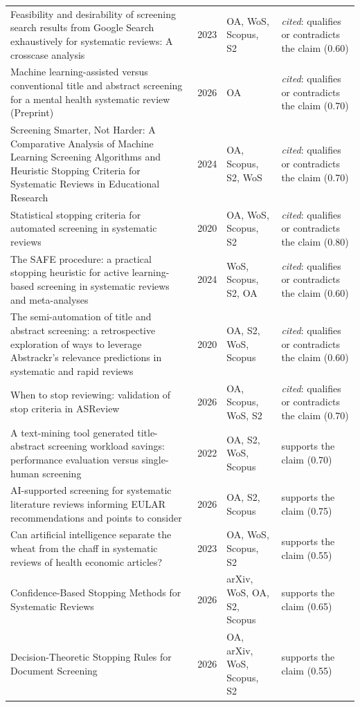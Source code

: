 \begin{longtable}{@{}%
  >{\raggedright\arraybackslash}p{}c%
  >{\raggedright\arraybackslash}p{}%
  >{\raggedright\arraybackslash}p{}@{}}
Feasibility and desirability of screening search results from Google Search exhaustively for systematic reviews: A crosscase analysis & 2023 & OA, WoS, Scopus, S2 & \emph{cited}: qualifies or contradicts the claim (0.60) \\
Machine learning-assisted versus conventional title and abstract screening for a mental health systematic review (Preprint) & 2026 & OA & \emph{cited}: qualifies or contradicts the claim (0.70) \\
Screening Smarter, Not Harder: A Comparative Analysis of Machine Learning Screening Algorithms and Heuristic Stopping Criteria for Systematic Reviews in Educational Research & 2024 & OA, Scopus, S2, WoS & \emph{cited}: qualifies or contradicts the claim (0.70) \\
Statistical stopping criteria for automated screening in systematic reviews & 2020 & OA, WoS, Scopus, S2 & \emph{cited}: qualifies or contradicts the claim (0.80) \\
The SAFE procedure: a practical stopping heuristic for active learning-based screening in systematic reviews and meta-analyses & 2024 & WoS, Scopus, S2, OA & \emph{cited}: qualifies or contradicts the claim (0.60) \\
The semi-automation of title and abstract screening: a retrospective exploration of ways to leverage Abstrackr's relevance predictions in systematic and rapid reviews & 2020 & OA, S2, WoS, Scopus & \emph{cited}: qualifies or contradicts the claim (0.60) \\
When to stop reviewing: validation of stop criteria in ASReview & 2026 & OA, Scopus, WoS, S2 & \emph{cited}: qualifies or contradicts the claim (0.70) \\
A text-mining tool generated title-abstract screening workload savings: performance evaluation versus single-human screening & 2022 & OA, S2, WoS, Scopus & supports the claim (0.70) \\
AI-supported screening for systematic literature reviews informing EULAR recommendations and points to consider & 2026 & OA, S2, Scopus & supports the claim (0.75) \\
Can artificial intelligence separate the wheat from the chaff in systematic reviews of health economic articles? & 2023 & OA, WoS, Scopus, S2 & supports the claim (0.55) \\
Confidence-Based Stopping Methods for Systematic Reviews & 2026 & arXiv, WoS, OA, S2, Scopus & supports the claim (0.65) \\
Decision-Theoretic Stopping Rules for Document Screening & 2026 & OA, arXiv, WoS, Scopus, S2 & supports the claim (0.55) \\

\end{longtable}
